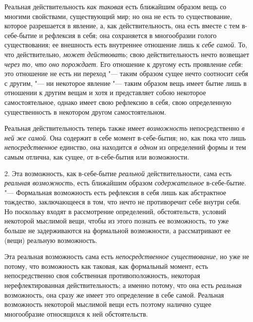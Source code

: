 Реальная действительность {\em как таковая} есть
ближайшим образом вещь со многими свойствами, существующий мир; но она не
есть то существование, которое разрешается в явление, а, как
действительность, она есть вместе с тем в-себе-бытие и рефлексия в себя;
она сохраняется в многообразии голого существования; ее внешность есть
внутреннее отношение лишь к {\em себе самой}. То, что
действительно, {\em может действовать}; свою
действительность нечто возвещает {\em через то, что оно
порождает}. Его отношение к другому есть проявление
{\em себя}: это отношение не есть ни переход "--- таким
образом сущее нечто соотносит себя с другим, "--- ни некоторое явление "--- таким
образом вещь имеет бытие лишь в отношении к другим вещам и хотя и
представляет собою некоторое самостоятельное, однако имеет свою рефлексию в
себя, свою определенную существенность в некотором другом самостоятельном.

Реальная действительность теперь также имеет
{\em возможность} непосредственно
{\em в ней же самой}. Она содержит в себе момент
в-себе-бытия; но, как пока что лишь
{\em непосредственное} единство, она находится
{\em в одном} из определений формы и тем самым отлична,
как сущее, от в-себе-бытия или возможности.

2. Эта возможность, как в-себе-бытие {\em реальной}
действительности, сама есть {\em реальная возможность},
есть ближайшим образом {\em содержательное}
в-себе-бытие. "--- Формальная возможность есть рефлексия в себя лишь как
абстрактное тождество, заключающееся в том, что нечто не противоречит себе
внутри себя. Но поскольку входят в рассмотрение определений, обстоятельств,
условий некоторой мыслимой вещи, чтобы из этого познать ее возможность, то
уже больше не задерживаются на формальной возможности, а рассматривают ее
(вещи) реальную возможность.

Эта реальная возможность сама есть {\em непосредственное
существование}, но уже не потому, что возможность как таковая, как
формальный момент, есть непосредственно своя собственная противоположность,
некоторая нерефлектированная действительность; а именно потому, что она
есть {\em реальная} возможность, она сразу же имеет это
определение в себе самой. Реальная возможность некоторой мыслимой вещи есть
поэтому налично сущее многообразие относящихся к ней обстоятельств.

